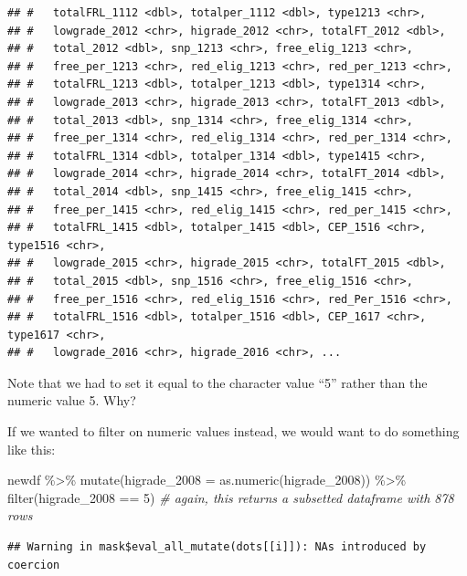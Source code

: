 \documentclass[
]{book}
\newenvironment{Shaded}{\begin{snugshade}}{\end{snugshade}}
\newcommand{\AttributeTok}[1]{\textcolor[rgb]{0.77,0.63,0.00}{#1}}
\newcommand{\CommentTok}[1]{\textcolor[rgb]{0.56,0.35,0.01}{\textit{#1}}}
\newcommand{\DecValTok}[1]{\textcolor[rgb]{0.00,0.00,0.81}{#1}}
\newcommand{\FunctionTok}[1]{\textcolor[rgb]{0.00,0.00,0.00}{#1}}
\newcommand{\NormalTok}[1]{#1}
\newcommand{\SpecialCharTok}[1]{\textcolor[rgb]{0.00,0.00,0.00}{#1}}
\begin{document}
\begin{verbatim}
## #   totalFRL_1112 <dbl>, totalper_1112 <dbl>, type1213 <chr>,
## #   lowgrade_2012 <chr>, higrade_2012 <chr>, totalFT_2012 <dbl>,
## #   total_2012 <dbl>, snp_1213 <chr>, free_elig_1213 <chr>,
## #   free_per_1213 <chr>, red_elig_1213 <chr>, red_per_1213 <chr>,
## #   totalFRL_1213 <dbl>, totalper_1213 <dbl>, type1314 <chr>,
## #   lowgrade_2013 <chr>, higrade_2013 <chr>, totalFT_2013 <dbl>,
## #   total_2013 <dbl>, snp_1314 <chr>, free_elig_1314 <chr>,
## #   free_per_1314 <chr>, red_elig_1314 <chr>, red_per_1314 <chr>,
## #   totalFRL_1314 <dbl>, totalper_1314 <dbl>, type1415 <chr>,
## #   lowgrade_2014 <chr>, higrade_2014 <chr>, totalFT_2014 <dbl>,
## #   total_2014 <dbl>, snp_1415 <chr>, free_elig_1415 <chr>,
## #   free_per_1415 <chr>, red_elig_1415 <chr>, red_per_1415 <chr>,
## #   totalFRL_1415 <dbl>, totalper_1415 <dbl>, CEP_1516 <chr>, type1516 <chr>,
## #   lowgrade_2015 <chr>, higrade_2015 <chr>, totalFT_2015 <dbl>,
## #   total_2015 <dbl>, snp_1516 <chr>, free_elig_1516 <chr>,
## #   free_per_1516 <chr>, red_elig_1516 <chr>, red_Per_1516 <chr>,
## #   totalFRL_1516 <dbl>, totalper_1516 <dbl>, CEP_1617 <chr>, type1617 <chr>,
## #   lowgrade_2016 <chr>, higrade_2016 <chr>, ...
\end{verbatim}

Note that we had to set it equal to the character value ``5'' rather than the numeric value 5. Why?

If we wanted to filter on numeric values instead, we would want to do something like this:

\begin{Shaded}
\begin{Highlighting}[]
\NormalTok{newdf }\SpecialCharTok{\%\textgreater{}\%} 
  \FunctionTok{mutate}\NormalTok{(}\AttributeTok{higrade\_2008 =} \FunctionTok{as.numeric}\NormalTok{(higrade\_2008)) }\SpecialCharTok{\%\textgreater{}\%} 
  \FunctionTok{filter}\NormalTok{(higrade\_2008 }\SpecialCharTok{==} \DecValTok{5}\NormalTok{) }\CommentTok{\# again, this returns a subsetted dataframe with 878 rows}
\end{Highlighting}
\end{Shaded}

\begin{verbatim}
## Warning in mask$eval_all_mutate(dots[[i]]): NAs introduced by coercion
\end{verbatim}
\end{document}
